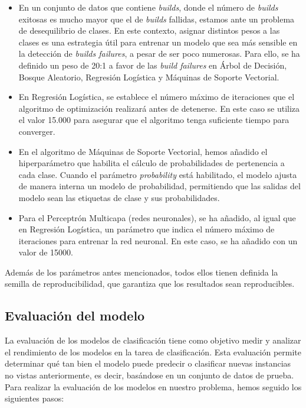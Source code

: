 \begin{itemize}
	\item En un conjunto de datos que contiene \textit{builds}, donde el número de \textit{builds}
    exitosas es mucho mayor que el de \textit{builds} fallidas, estamos ante un problema de
    desequilibrio de clases. En este contexto, asignar distintos pesos a las clases es una
    estrategia útil para entrenar un modelo que sea más sensible en la detección de
    \textit{builds failures}, a pesar de ser poco numerosas. Para ello, se ha definido un peso de
    20:1 a favor de las \textit{build failures} en Árbol de Decisión, Bosque Aleatorio, Regresión
    Logística y Máquinas de Soporte Vectorial.\\

	\item En Regresión Logística, se establece el número máximo de iteraciones que el algoritmo de
    optimización realizará antes de detenerse. En este caso se utiliza el valor 15.000 para
    asegurar que el algoritmo tenga suficiente tiempo para converger.\\

	\item En el algoritmo de Máquinas de Soporte Vectorial, hemos añadido el hiperparámetro que
    habilita el cálculo de probabilidades de pertenencia a cada clase. Cuando el parámetro
    \textit{probability} está habilitado, el modelo ajusta de manera interna un modelo de
    probabilidad, permitiendo que las salidas del modelo sean las etiquetas de clase y sus
    probabilidades.\\

	\item Para el Perceptrón Multicapa (redes neuronales), se ha añadido, al igual que en Regresión
    Logística, un parámetro que indica el número máximo de iteraciones para entrenar la red
    neuronal. En este caso, se ha añadido con un valor de 15000.
\end{itemize}

Además de los parámetros antes mencionados, todos ellos tienen definida la semilla de
reproducibilidad, que garantiza que los resultados sean reproducibles.

\subsection{Evaluación del modelo}
La evaluación de los modelos de clasificación tiene como objetivo medir y analizar el rendimiento
de los modelos en la tarea de clasificación. Esta evaluación permite determinar qué tan bien el
modelo puede predecir o clasificar nuevas instancias no vistas anteriormente, es decir, basándose
en un conjunto de datos de prueba. Para realizar la evaluación de los modelos en nuestro problema,
hemos seguido los siguientes pasos:

